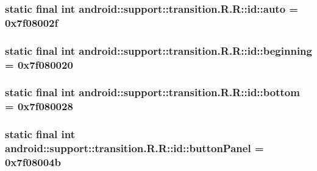 \hypertarget{classandroid_1_1support_1_1transition_1_1_r_1_1id_af775f9e08b01a682a10603df4cb2f6d}{
\subsubsection[{auto}]{\setlength{\rightskip}{0pt plus 5cm}static final int android::support::transition.R.R::id::auto = 0x7f08002f}}
\label{classandroid_1_1support_1_1transition_1_1_r_1_1id_af775f9e08b01a682a10603df4cb2f6d}


\hypertarget{classandroid_1_1support_1_1transition_1_1_r_1_1id_79a2e264eb509286a710256a578c3244}{
\subsubsection[{beginning}]{\setlength{\rightskip}{0pt plus 5cm}static final int android::support::transition.R.R::id::beginning = 0x7f080020}}
\label{classandroid_1_1support_1_1transition_1_1_r_1_1id_79a2e264eb509286a710256a578c3244}


\hypertarget{classandroid_1_1support_1_1transition_1_1_r_1_1id_921e9343a5f2564b66fa509543b6f311}{
\subsubsection[{bottom}]{\setlength{\rightskip}{0pt plus 5cm}static final int android::support::transition.R.R::id::bottom = 0x7f080028}}
\label{classandroid_1_1support_1_1transition_1_1_r_1_1id_921e9343a5f2564b66fa509543b6f311}


\hypertarget{classandroid_1_1support_1_1transition_1_1_r_1_1id_d7d67fba018dfcabf822b10cf0f0e91f}{
\subsubsection[{buttonPanel}]{\setlength{\rightskip}{0pt plus 5cm}static final int android::support::transition.R.R::id::buttonPanel = 0x7f08004b}}
\label{classandroid_1_1support_1_1transition_1_1_r_1_1id_d7d67fba018dfcabf822b10cf0f0e91f}


